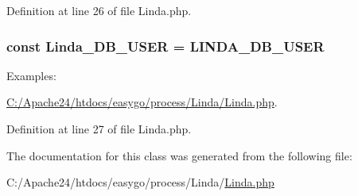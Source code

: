 Definition at line 26 of file Linda.\+php.

\hypertarget{class_linda_a73fe432dd03d1c21aa74940da5c04dc0}{}
\subsubsection[{Linda\+\_\+\+D\+B\+\_\+\+U\+S\+E\+R}]{\setlength{\rightskip}{0pt plus 5cm}const Linda\+\_\+\+D\+B\+\_\+\+U\+S\+E\+R = {\bf L\+I\+N\+D\+A\+\_\+\+D\+B\+\_\+\+U\+S\+E\+R}}\label{class_linda_a73fe432dd03d1c21aa74940da5c04dc0}
\begin{Desc}
\item[Examples\+: ]\par
\hyperlink{_c_1_2_apache24_2htdocs_2easygo_2process_2_linda_2_linda_8php-example}{C\+:/\+Apache24/htdocs/easygo/process/\+Linda/\+Linda.\+php}.\end{Desc}


Definition at line 27 of file Linda.\+php.



The documentation for this class was generated from the following file\+:\begin{DoxyCompactItemize}
\item 
C\+:/\+Apache24/htdocs/easygo/process/\+Linda/\hyperlink{_linda_8php}{Linda.\+php}\end{DoxyCompactItemize}
